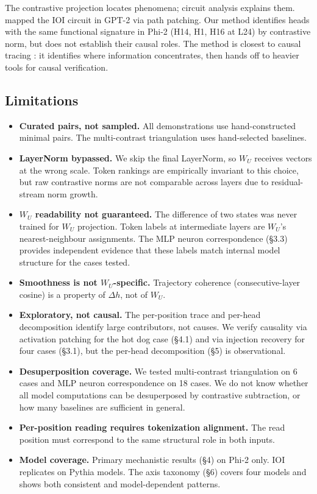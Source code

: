 \documentclass[11pt]{article}
\newcommand{\dhh}{\Delta h}
\newcommand{\WU}{W_U}
\begin{document}
The contrastive projection locates phenomena; circuit analysis explains
them.~\citet{wang2023} mapped the IOI circuit in GPT-2 via path
patching. Our method identifies heads with the same functional signature
in Phi-2 (H14, H1, H16 at L24) by contrastive norm, but does not
establish their causal roles. The method is closest to causal tracing
\citep{meng2022}: it identifies where information concentrates, then
hands off to heavier tools for causal verification.

\subsection{Limitations}

\begin{itemize}[leftmargin=*]
\item \textbf{Curated pairs, not sampled.} All demonstrations use hand-constructed
  minimal pairs. The multi-contrast triangulation uses hand-selected
  baselines.
\item \textbf{LayerNorm bypassed.} We skip the final LayerNorm, so $\WU$ receives
  vectors at the wrong scale. Token rankings are empirically invariant to
  this choice, but raw contrastive norms are not comparable across layers
  due to residual-stream norm growth.
\item \textbf{$\WU$ readability not guaranteed.} The difference of two states was
  never trained for $\WU$ projection. Token labels at intermediate layers
  are $\WU$'s nearest-neighbour assignments. The MLP neuron correspondence
  (\S3.3) provides independent evidence that these labels match internal
  model structure for the cases tested.
\item \textbf{Smoothness is not $\WU$-specific.} Trajectory coherence
  (consecutive-layer cosine) is a property of $\dhh$, not of $\WU$.
\item \textbf{Exploratory, not causal.} The per-position trace and per-head
  decomposition identify large contributors, not causes. We verify
  causality via activation patching for the hot dog case (\S4.1) and via
  injection recovery for four cases (\S3.1), but the per-head
  decomposition (\S5) is observational.
\item \textbf{Desuperposition coverage.} We tested multi-contrast triangulation on
  6 cases and MLP neuron correspondence on 18 cases. We do not know
  whether all model computations can be desuperposed by contrastive
  subtraction, or how many baselines are sufficient in general.
\item \textbf{Per-position reading requires tokenization alignment.} The read
  position must correspond to the same structural role in both inputs.
\item \textbf{Model coverage.} Primary mechanistic results (\S4) on Phi-2 only.
  IOI replicates on Pythia models. The axis taxonomy (\S6) covers four
  models and shows both consistent and model-dependent patterns.
\end{itemize}
\end{document}
